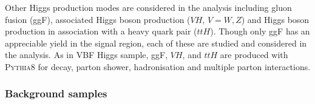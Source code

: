 Other Higgs production modes are considered in the analysis including gluon fusion (ggF), associated Higgs boson production ($VH$, $V=W,Z$) and Higgs boson production in association with a heavy quark pair ($ttH$). Though only ggF has an appreciable yield in the signal region, each of these are studied and considered in the analysis. As in VBF Higgs sample, ggF, $VH$, and $ttH$ are produced with \textsc{Pythia8}\cite{pythia,Sjostrand:2007gs} for decay, parton shower, hadronisation and multiple parton interactions.

 
\subsubsection{Background samples}
\label{sec:bkgMC}

